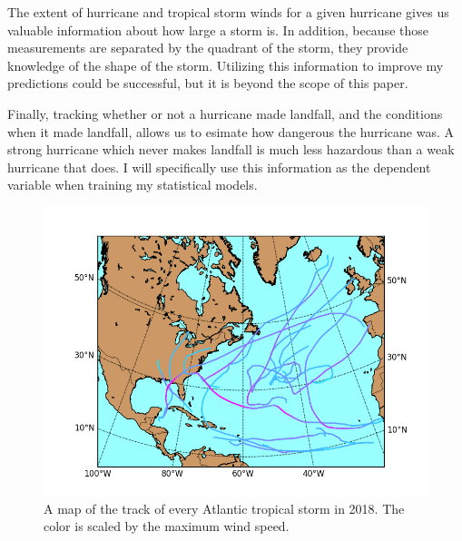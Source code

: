 \par
The extent of hurricane and tropical storm winds for a given hurricane gives us valuable information about how large a storm is.
In addition, because those measurements are separated by the quadrant of the storm, they provide knowledge of the shape of the storm.
Utilizing this information to improve my predictions could be successful, but it is beyond the scope of this paper.

\par
Finally, tracking whether or not a hurricane made landfall, and the conditions when it made landfall, allows us to esimate how dangerous the hurricane was.
A strong hurricane which never makes landfall is much less hazardous than a weak hurricane that does.
I will specifically use this information as the dependent variable when training my statistical models.

\begin{figure}
	\centering
	\includegraphics[width=\linewidth]{images/2018_max_winds.png}
	\caption{A map of the track of every Atlantic tropical storm in 2018. The color is scaled by the maximum wind speed.}
	\label{fig:2018_storm_tracks}
\end{figure}

